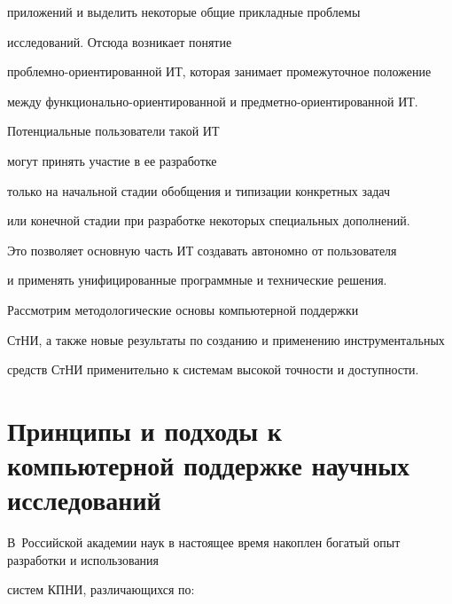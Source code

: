 приложений и выделить некоторые общие прикладные проблемы


исследований. Отсюда возникает понятие 


проб\-лем\-но-ориенти\-ро\-ван\-ной ИТ, которая занимает промежуточное положение


между  функ\-ци\-о\-наль\-но-ориенти\-ро\-ван\-ной и пред\-мет\-но-ориенти\-ро\-ван\-ной ИТ. 


Потенциальные пользователи такой ИТ


могут принять участие в ее разработке


только на начальной стадии обобщения и типизации конкретных задач


или конечной стадии при разработке некоторых специальных дополнений.


Это позволяет основную часть ИТ создавать автономно от пользователя


и применять унифицированные программные и технические решения.





Рассмотрим методологические основы компьютерной поддержки 


СтНИ, а также новые результаты по созданию и применению  инструментальных 


средств СтНИ применительно к системам высокой точности и доступности.





\section{Принципы и подходы к компьютерной поддержке научных исследований}





В~Российской академии наук в настоящее время накоплен богатый опыт разработки и использования


сис\-тем КПНИ, различающихся по:


